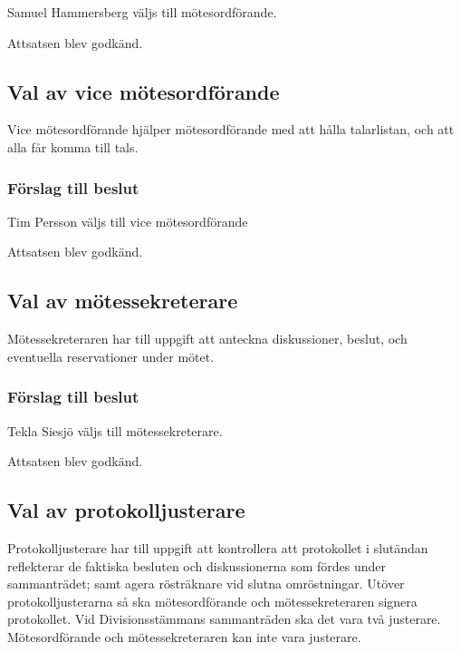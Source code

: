 \documentclass[protokoll]{dvd}
\begin{document}
\begin{attsatser}
    \item Samuel Hammersberg väljs till mötesordförande.
\end{attsatser}

Attsatsen blev godkänd.

\subsection{Val av vice mötesordförande}

Vice mötesordförande hjälper mötesordförande med att hålla talarlistan, och att alla får komma till tals.

\subsubsection*{Förslag till beslut}

\begin{attsatser}
    \item Tim Persson väljs till vice mötesordförande
\end{attsatser}

Attsatsen blev godkänd.

\subsection{Val av mötessekreterare}

Mötessekreteraren har till uppgift att anteckna diskussioner, beslut, och eventuella reservationer under mötet.

\subsubsection*{Förslag till beslut}

\begin{attsatser}
    \item Tekla Siesjö väljs till mötessekreterare.
\end{attsatser}

Attsatsen blev godkänd.

\subsection{Val av protokolljusterare}

Protokolljusterare har till uppgift att kontrollera att protokollet i slutändan reflekterar de faktiska besluten och diskussionerna som fördes under sammanträdet; samt agera rösträknare vid slutna omröstningar.
Utöver protokolljusterarna så ska mötesordförande och mötessekreteraren signera protokollet.
Vid Divisionsstämmans sammanträden ska det vara två justerare.
Mötesordförande och mötessekreteraren kan inte vara justerare.
\end{document}

